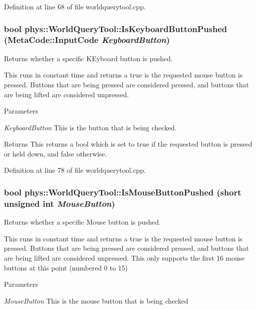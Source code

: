 Definition at line 68 of file worldquerytool.cpp.

\hypertarget{classphys_1_1WorldQueryTool_a8343f54b900adb316ddc6de5405da328}{
\subsubsection[{IsKeyboardButtonPushed}]{\setlength{\rightskip}{0pt plus 5cm}bool phys::WorldQueryTool::IsKeyboardButtonPushed ({\bf MetaCode::InputCode} {\em KeyboardButton})}}
\label{d8/d69/classphys_1_1WorldQueryTool_a8343f54b900adb316ddc6de5405da328}


Returns whether a specific KEyboard button is pushed. 

This runs in constant time and returns a true is the requested mouse button is pressed. Buttons that are being pressed are considered pressed, and buttons that are being lifted are considered unpressed. 
\begin{DoxyParams}{Parameters}
\item[{\em KeyboardButton}]This is the button that is being checked. \end{DoxyParams}
\begin{DoxyReturn}{Returns}
This returns a bool which is set to true if the requested button is pressed or held down, and false otherwise. 
\end{DoxyReturn}


Definition at line 78 of file worldquerytool.cpp.

\hypertarget{classphys_1_1WorldQueryTool_af277b578432dfaefffbc4fd9bb80ca64}{
\subsubsection[{IsMouseButtonPushed}]{\setlength{\rightskip}{0pt plus 5cm}bool phys::WorldQueryTool::IsMouseButtonPushed (short unsigned int {\em MouseButton})}}
\label{d8/d69/classphys_1_1WorldQueryTool_af277b578432dfaefffbc4fd9bb80ca64}


Returns whether a specific Mouse button is pushed. 

This runs in constant time and returns a true is the requested mouse button is pressed. Buttons that are being pressed are considered pressed, and buttons that are being lifted are considered unpressed. This only supports the first 16 mouse buttons at this point (numbered 0 to 15) 
\begin{DoxyParams}{Parameters}
\item[{\em MouseButton}]This is the mouse button that is being checked \end{DoxyParams}

